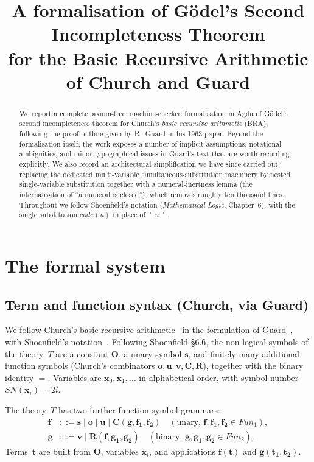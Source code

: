 \documentclass[11pt]{article}
\title{A formalisation of G\"odel's Second Incompleteness Theorem\\for the Basic Recursive Arithmetic of Church and Guard}
\author{}
\date{}
\theoremstyle{plain}
\theoremstyle{definition}
\theoremstyle{remark}
\newcommand{\code}[1]{\mathit{code}(#1)}
\newcommand{\Fun}{\mathit{Fun}}
\newcommand{\SN}{\mathit{SN}}
\begin{document}
\maketitle

\begin{abstract}
We report a complete, axiom-free, machine-checked formalisation in Agda
of G\"odel's second incompleteness theorem for Church's \emph{basic
recursive arithmetic} (BRA), following the proof outline given by
R.~Guard in his 1963 paper.  Beyond the formalisation itself, the work
exposes a number of implicit assumptions, notational ambiguities, and
minor typographical issues in Guard's text that are worth recording
explicitly.  We also record an architectural simplification we have since
carried out: replacing the dedicated multi-variable simultaneous-substitution
machinery by nested single-variable substitution together with a
numeral-inertness lemma (the internalisation of ``a numeral is closed''),
which removes roughly ten thousand lines.  Throughout we follow Shoenfield's notation
(\emph{Mathematical Logic}, Chapter~6), with the single substitution
$\code{u}$ in place of $\ulcorner u \urcorner$.
\end{abstract}

\section{The formal system}

\subsection{Term and function syntax (Church, via Guard)}

We follow Church's basic recursive arithmetic~\cite{Church} in the
formulation of Guard~\cite{Guard1963}, with Shoenfield's
notation~\cite{Shoenfield}.  Following Shoenfield {\S}6.6, the
non-logical symbols of the theory~$T$
are a constant $\mathbf{O}$, a unary symbol $\mathbf{s}$, and finitely
many additional function symbols (Church's combinators
$\mathbf{o},\mathbf{u},\mathbf{v},\mathbf{C},\mathbf{R}$), together with
the binary identity $=$.  Variables are $\mathbf{x}_0, \mathbf{x}_1,
\ldots$ in alphabetical order, with symbol number
$\SN(\mathbf{x}_i) = 2i$.

The theory~$T$ has two further function-symbol grammars:
\begin{align*}
\mathbf{f}   &::= \mathbf{s} \mid \mathbf{o} \mid \mathbf{u} \mid \mathbf{C}(\mathbf{g}, \mathbf{f_1}, \mathbf{f_2}) \quad (\text{unary, } \mathbf{f}, \mathbf{f_1}, \mathbf{f_2} \in \Fun_1), \\
\mathbf{g}   &::= \mathbf{v} \mid \mathbf{R}(\mathbf{f}, \mathbf{g_1}, \mathbf{g_2}) \quad (\text{binary, } \mathbf{g}, \mathbf{g_1}, \mathbf{g_2} \in \Fun_2).
\end{align*}
Terms~$\mathbf{t}$ are built from $\mathbf{O}$, variables
$\mathbf{x}_i$, and applications $\mathbf{f}(\mathbf{t})$ and
$\mathbf{g}(\mathbf{t_1}, \mathbf{t_2})$.
\end{document}
